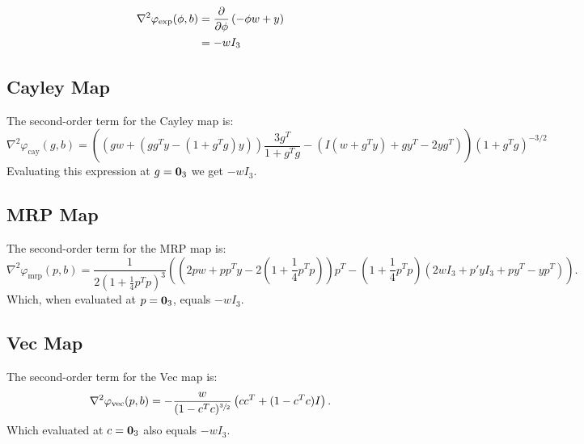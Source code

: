 \documentclass[../root.tex]{subfiles}
\begin{document}
\begin{equation}
    \begin{aligned}
        \nabla^2 \varphi_\text{exp}(\phi,b) &= \pdv{}{\phi} \left( -\phi w + y \right) \\
        &= -w I_3
    \end{aligned}
\end{equation}

\subsection{Cayley Map}
The second-order term for the Cayley map is:
\begin{equation} \label{eq:cayley_hess}
    \nabla^2 \varphi_\text{cay}(g,b) = 
        \left( 
            \left( g w + (g g^T y - (1+g^T g) y) \right) \frac{3 g^T}{1+g^T g} - 
            \left( I (w + g^T y) + g y^T - 2y g^T \right) 
        \right) (1 + g^T g)^{-3/2}
\end{equation}
Evaluating this expression at $g = \mathbf{0}_3$ we get $-w I_3$.

\subsection{MRP Map}
The second-order term for the MRP map is:
\begin{equation}
    \nabla^2 \varphi_\text{mrp}(p,b) = 
        \frac{1}{2(1 + \frac{1}{4}p^Tp)^3}
        \left(
            \left( 2p w + p p^T y - 2(1 + \frac{1}{4}p^Tp) \right) p^T - 
            (1 + \frac{1}{4}p^Tp) \left( 2w I_3 + p'y I_3 + p y^T - y p^T \right)
        \right).
\end{equation}
Which, when evaluated at $p = \mathbf{0}_3$, equals $-w I_3$.

\subsection{Vec Map}
The second-order term for the Vec map is:
\begin{equation}
    \nabla^2 \varphi_\text{vec}(p,b) = 
    -\frac{w}{(1-c^T c)^{\sfrac{3}{2}}} \left( c c^T + (1-c^T c) I \right).
\end{equation}
Which evaluated at $c = \mathbf{0}_3$ also equals $-w I_3$.
\end{document}
